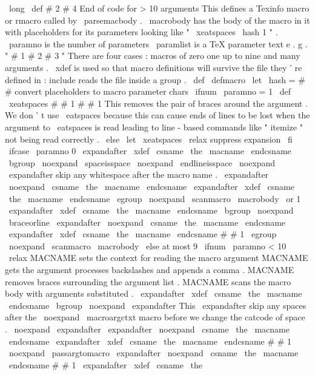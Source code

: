 {{{{%
\
long
\
def
#
2
{
#
4
}
%
}
%
%
%
%
%
%
%
%
%
%
%
%
%
%
End
of
code
for
>
10
arguments
%
%
%
%
%
%
%
%
%
%
%
%
%
%
%
%
%
%
%
This
defines
a
Texinfo
macro
or
rmacro
called
by
\
parsemacbody
.
%
\
macrobody
has
the
body
of
the
macro
in
it
with
placeholders
for
%
its
parameters
looking
like
"
\
xeatspaces
{
\
hash
1
}
"
.
%
\
paramno
is
the
number
of
parameters
%
\
paramlist
is
a
TeX
parameter
text
e
.
g
.
"
#
1
#
2
#
3
"
%
There
are
four
cases
:
macros
of
zero
one
up
to
nine
and
many
arguments
.
%
\
xdef
is
used
so
that
macro
definitions
will
survive
the
file
%
they
'
re
defined
in
:
include
reads
the
file
inside
a
group
.
%
\
def
\
defmacro
{
%
\
let
\
hash
=
#
#
%
convert
placeholders
to
macro
parameter
chars
\
ifnum
\
paramno
=
1
\
def
\
xeatspaces
#
#
1
{
#
#
1
}
%
%
This
removes
the
pair
of
braces
around
the
argument
.
We
don
'
t
%
use
\
eatspaces
because
this
can
cause
ends
of
lines
to
be
lost
%
when
the
argument
to
\
eatspaces
is
read
leading
to
line
-
based
%
commands
like
"
itemize
"
not
being
read
correctly
.
\
else
\
let
\
xeatspaces
\
relax
%
suppress
expansion
\
fi
\
ifcase
\
paramno
%
0
\
expandafter
\
xdef
\
csname
\
the
\
macname
\
endcsname
{
%
\
bgroup
\
noexpand
\
spaceisspace
\
noexpand
\
endlineisspace
\
noexpand
\
expandafter
%
skip
any
whitespace
after
the
macro
name
.
\
expandafter
\
noexpand
\
csname
\
the
\
macname
\
endcsname
}
%
\
expandafter
\
xdef
\
csname
\
the
\
macname
\
endcsname
{
%
\
egroup
\
noexpand
\
scanmacro
{
\
macrobody
}
}
%
\
or
%
1
\
expandafter
\
xdef
\
csname
\
the
\
macname
\
endcsname
{
%
\
bgroup
\
noexpand
\
braceorline
\
expandafter
\
noexpand
\
csname
\
the
\
macname
\
endcsname
}
%
\
expandafter
\
xdef
\
csname
\
the
\
macname
\
endcsname
#
#
1
{
%
\
egroup
\
noexpand
\
scanmacro
{
\
macrobody
}
%
}
%
\
else
%
at
most
9
\
ifnum
\
paramno
<
10
\
relax
%
MACNAME
sets
the
context
for
reading
the
macro
argument
%
MACNAME
gets
the
argument
processes
backslashes
and
appends
a
%
comma
.
%
MACNAME
removes
braces
surrounding
the
argument
list
.
%
MACNAME
scans
the
macro
body
with
arguments
substituted
.
\
expandafter
\
xdef
\
csname
\
the
\
macname
\
endcsname
{
%
\
bgroup
\
noexpand
\
expandafter
%
This
\
expandafter
skip
any
spaces
after
the
\
noexpand
\
macroargctxt
%
macro
before
we
change
the
catcode
of
space
.
\
noexpand
\
expandafter
\
expandafter
\
noexpand
\
csname
\
the
\
macname
\
endcsname
}
%
\
expandafter
\
xdef
\
csname
\
the
\
macname
\
endcsname
#
#
1
{
%
\
noexpand
\
passargtomacro
\
expandafter
\
noexpand
\
csname
\
the
\
macname
\
endcsname
{
#
#
1
}
}
%
\
expandafter
\
xdef
\
csname
\
the
}}}}
